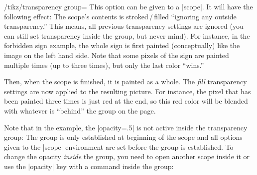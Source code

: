 \begin{key}{/tikz/transparency group=}
  This option can be given to a |scope|. It will have the following
  effect: The scope's contents is stroked\,/\,filled
  ``ignoring any outside transparency.'' This means, all previous
  transparency settings are ignored (you can still set transparency
  inside the group, but never mind). For instance, in the forbidden
  sign example, the whole sign is first painted (conceptually) like
  the image on the left hand side. Note that some pixels of the sign
  are painted multiple times (up to three times), but only the last
  color ``wins.''

  Then, when the scope is finished, it is painted as a whole. The
  \emph{fill} transparency settings are now applied to the resulting
  picture. For instance, the pixel that has been painted three times
  is just red at the end, so this red color will be blended with
  whatever is ``behind'' the group on the page.

\begin{codeexample}[]
\end{codeexample}

  Note that in the example, the |opacity=.5| is not active inside the
  transparency group: The group is only established at beginning of
  the scope and all options given to the |{scope}| environment are set
  before the group is established. To change the opacity \emph{inside}
  the group, you need to open another scope inside it or use the
  |opacity| key with a command inside the group:

\begin{codeexample}[]
\end{codeexample}
\end{key}
